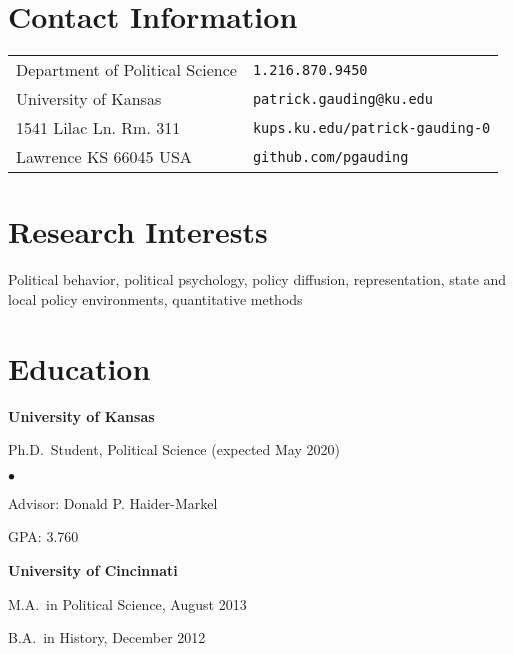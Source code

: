 \documentclass[margin,line,pifont,palatino,courier]{res}
\newenvironment{list1}{
  \begin{list}{\ding{113}}{%
      \setlength{\itemsep}{0in}
      \setlength{\parsep}{0in} \setlength{\parskip}{0in}
      \setlength{\topsep}{0in} \setlength{\partopsep}{0in}
      \setlength{\leftmargin}{0.17in}}}{\end{list}}
\newenvironment{list2}{
  \begin{list}{$\bullet$}{%
      \setlength{\itemsep}{0in}
      \setlength{\parsep}{0in} \setlength{\parskip}{0in}
      \setlength{\topsep}{0in} \setlength{\partopsep}{0in}
      \setlength{\leftmargin}{0.2in}}}{\end{list}}
\begin{document}

\begin{resume}

\section{\sc Contact Information}

\vspace{.05in}
\begin{tabular}{@{}p{2.75in}p{2in}}
Department of Political Science & \verb+1.216.870.9450+ \\
University of Kansas            & \verb+patrick.gauding@ku.edu+\\
1541 Lilac Ln. Rm. 311          & \verb+kups.ku.edu/patrick-gauding-0+\\
Lawrence KS 66045 USA           & \verb+github.com/pgauding+\\
\end{tabular}

\section{\sc Research Interests}
Political behavior, political psychology, policy diffusion, representation, state and local policy environments, quantitative methods

\section{\sc Education}

{\bf University of Kansas}\\
\begin{list1}
\item[] Ph.D.~Student, Political Science (expected May 2020)

\begin{list2}
\vspace*{.05in}
\item Advisor: Donald P. Haider-Markel
\item GPA: 3.760
\end{list2}
\end{list1}

{\bf University of Cincinnati}\\
\begin{list1}
\item[] M.A.~in Political Science, August 2013
\item[] B.A.~in History, December 2012


\end{list1}
\end{resume}
\end{document}
